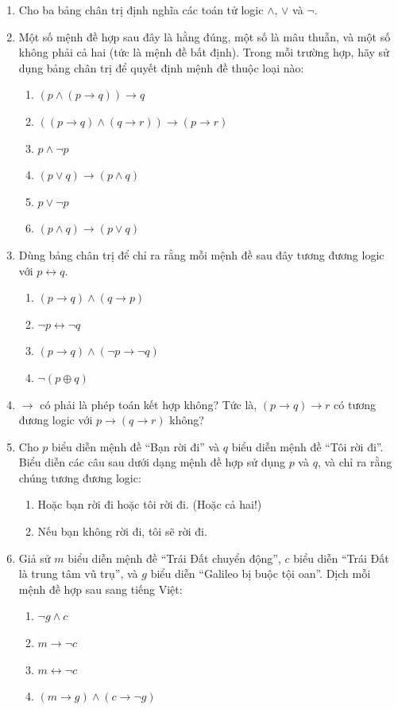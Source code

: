 \begin{enumerate}
\item[$\dagger$1.] Cho ba bảng chân trị định nghĩa các toán tử logic $\land$, $\lor$ và $\lnot$.

\item[$\dagger$2.] Một số mệnh đề hợp sau đây là hằng đúng, một số là mâu thuẫn, và một số không phải cả hai (tức là mệnh đề bất định). Trong mỗi trường hợp, hãy sử dụng bảng chân trị để quyết định mệnh đề thuộc loại nào:
\begin{enumerate}[label=\alph*)]
\item $(p \land (p \to q)) \to q$
\item $((p \to q) \land (q \to r)) \to (p \to r)$
\item $p \land \lnot p$
\item $(p \lor q) \to (p \land q)$
\item $p \lor \lnot p$
\item $(p \land q) \to (p \lor q)$
\end{enumerate}

\item[$\dagger$3.] Dùng bảng chân trị để chỉ ra rằng mỗi mệnh đề sau đây tương đương logic với $p \leftrightarrow q$.
\begin{enumerate}[label=\alph*)]
\item $(p \to q) \land (q \to p)$
\item $\lnot p \leftrightarrow \lnot q$
\item $(p \to q) \land (\lnot p \to \lnot q)$
\item $\lnot(p \oplus q)$
\end{enumerate}

\item[$\dagger$4.] $\to$ có phải là phép toán kết hợp không? Tức là, $(p \to q) \to r$ có tương đương logic với $p \to (q \to r)$ không?

\item[$\dagger$5.] Cho $p$ biểu diễn mệnh đề ``Bạn rời đi'' và $q$ biểu diễn mệnh đề ``Tôi rời đi''. Biểu diễn các câu sau dưới dạng mệnh đề hợp sử dụng $p$ và $q$, và chỉ ra rằng chúng tương đương logic:
\begin{enumerate}[label=\alph*)]
\item Hoặc bạn rời đi hoặc tôi rời đi. (Hoặc cả hai!)
\item Nếu bạn không rời đi, tôi sẽ rời đi.
\end{enumerate}

\item[$\dagger$6.] Giả sử $m$ biểu diễn mệnh đề ``Trái Đất chuyển động'', $c$ biểu diễn ``Trái Đất là trung tâm vũ trụ'', và $g$ biểu diễn ``Galileo bị buộc tội oan''. Dịch mỗi mệnh đề hợp sau sang tiếng Việt:
\begin{enumerate}[label=\alph*)]
\item $\lnot g \land c$
\item $m \to \lnot c$
\item $m \leftrightarrow \lnot c$
\item $(m \to g) \land (c \to \lnot g)$
\end{enumerate}


\end{enumerate}
